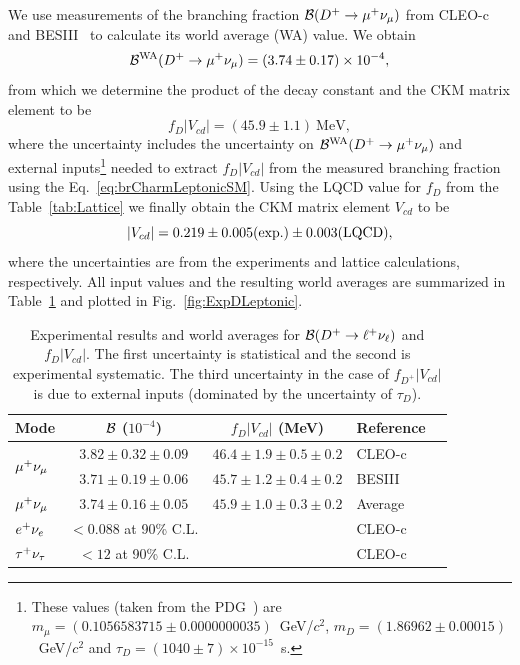 We use measurements of the branching fraction ${\cal B}(D^+\to\mu^+\nu_{\mu})$ from \mbox{CLEO-c}~\cite{Eisenstein:2008aa} and 
BESIII~\cite{Ablikim:2013uvu} to calculate its world average (WA) value. We obtain
\[
 {\cal B}^{\rm WA}(D^+\to\mu^+\nu_{\mu}) = (3.74\pm0.17)\times10^{-4},
\]
from which we determine the product of the decay constant and the CKM matrix element to be
\begin{equation}
 f_{D}|V_{cd}| = \left(45.9\pm1.1\right)~\mbox{MeV},
 \label{eq:expFDVCD}
\end{equation}
where the uncertainty includes the uncertainty on ${\cal B}^{\rm WA}(D^+\to\mu^+\nu_{\mu})$ and external inputs\footnote{These values (taken from the PDG~\cite{PDG_2012}) are
$m_{\mu} = (0.1056583715\pm0.0000000035)$~GeV/$c^2$, $m_D = (1.86962\pm0.00015)$~GeV/$c^2$ 
and $\tau_D = (1040\pm7)\times 10^{-15}$~s.} needed to extract $f_{D}|V_{cd}|$ from the 
measured branching fraction using the Eq.~\ref{eq:brCharmLeptonicSM}. 
Using the LQCD value for $f_D$ from the Table~\ref{tab:Lattice} we 
finally obtain the CKM matrix element $V_{cd}$ to be
\[
 |V_{cd}| = 0.219\pm0.005(\rm exp.)\pm0.003(\rm LQCD),
\]
where the uncertainties are from the experiments and lattice calculations, respectively. All input values
and the resulting world averages are summarized in Table~\ref{tab:DExpLeptonic} and plotted in 
Fig.~\ref{fig:ExpDLeptonic}.
\begin{table}[t!]
\caption{Experimental results and world averages for ${\cal{B}}(D^+\to \ell^+\nu_{\ell})$ and $f_{D}|V_{cd}|$.
The first uncertainty is statistical and the second is experimental systematic. The third uncertainty in the case
of $f_{D^+}|V_{cd}|$ is due to external inputs (dominated by the uncertainty of $\tau_D$).
\label{tab:DExpLeptonic}}
\begin{center}
\begin{tabular}{lccll}
\toprule
\rowcolor{gray} Mode 	& ${\cal{B}}$ ($10^{-4}$)	& $f_{D}|V_{cd}|$ (MeV)		& Reference & \\ 
\midrule
\multirow{2}{*}{$\mu^+\nu_{\mu}$} & $3.82\pm0.32\pm 0.09$ 	& $46.4\pm1.9\pm0.5\pm0.2$	& CLEO-c & \cite{Eisenstein:2008aa}\\ 
			& $3.71\pm0.19\pm 0.06$ 	& $45.7\pm1.2\pm0.4\pm0.2$	& BESIII & \cite{Ablikim:2013uvu}\\
\midrule
\rowcolor{gray}$\mu^+\nu_{\mu}$ 	& $3.74\pm0.16\pm 0.05$		& $45.9\pm1.0\pm0.3\pm0.2$	& Average & \\
\midrule
$e^+\nu_{e}$	 		& {$<0.088$ at 90\% C.L.}	&& CLEO-c & \cite{Eisenstein:2008aa}\\
\midrule
$\tau^+\nu_{\tau}$ 		& {$<12$ at 90\% C.L.}		&& CLEO-c & \cite{Eisenstein:2008aa}
\\ \bottomrule
\end{tabular}
\end{center}
\end{table}
